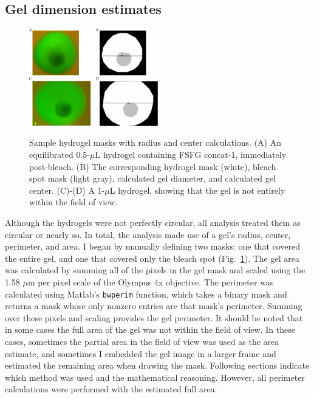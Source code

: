 \subsection{Gel dimension estimates}
\label{sec:gel-dim}

\begin{figure} 
\caption[Hydrogel masks with radius and center calculations.]{Sample hydrogel masks with radius and center calculations.  (A) An equilibrated 0.5-$\mu$L hydrogel containing FSFG concat-1, immediately post-bleach. (B) The corresponding hydrogel mask (white), bleach spot mask (light gray), calculated gel diameter, and calculated gel center. (C)-(D) A 1-$\mu$L hydrogel, showing that the gel is not entirely within the field of view.}
\centering
\includegraphics[width=0.5\textwidth]{figs/ch04/geometry.pdf}
\label{fig:masks}
\end{figure} 

Although the hydrogels were not perfectly circular, all analysis treated them as circular or nearly so.  In total, the analysis made use of a gel's radius, center, perimeter, and area.  I began by manually defining two masks: one that covered the entire gel, and one that covered only the bleach spot (Fig.~\ref{fig:masks}).  The gel area was calculated by summing all of the pixels in the gel mask and scaled using the 1.58 $\mu$m per pixel scale of the Olympus 4x objective.  The perimeter was calculated using Matlab's \texttt{bwperim} function, which takes a binary mask and returns a mask whose only nonzero entries are that mask's perimeter.  Summing over these pixels and scaling provides the gel perimeter.  It should be noted that in some cases the full area of the gel was not within the field of view.  In these cases, sometimes the partial area in the field of view was used as the area estimate, and sometimes I embedded the gel image in a larger frame and estimated the remaining area when drawing the mask.  Following sections indicate which method was used and the mathematical reasoning.  However, all perimeter calculations were performed with the estimated full area.


